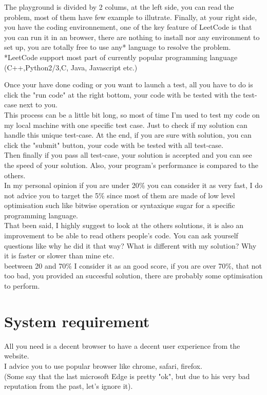 \documentclass[12pt, letterpaper]{article}
\begin{document}
The playground is divided by 2 colums, at the left side, you can read the problem, most of them have few example to illutrate. Finally, at your right side, you have the coding environnement, one of the key feature of LeetCode is that you can run it in an browser, there are nothing to install nor any environment to set up, you are totally free to use any* language to resolve the problem.\\
*LeetCode support most part of currently popular programming language (C++,Python2/3,C, Java, Javascript etc.)

Once your have done coding or you want to launch a test, all you have to do is click the "run code" at the right bottom, your code with be tested with the test-case next to you.\\

This process can be a little bit long, so most of time I'm used to test my code on my local machine with one specific test case. Just to check if my solution can handle this unique test-case.
At the end, if you are sure with solution, you can click the "submit" button, your code with be tested with all test-case.\\
Then finally if you pass all test-case, your solution is accepted and you can see the speed of your solution. Also, your program's performance is compared to the others.\\
In my personal opinion if you are under 20\% you can consider it as very fast, I do not advice you to target the 5\% since most of them are made of low level optimisation such like bitwise operation or syntaxique sugar for a specific programming language.\\
That been said, I highly suggest to look at the others solutions, it is also an improvement to be able to read others people's code. You can ask yourself questions like why he did it that way? What is different with my solution? Why it is faster or slower than mine etc.\\
beetween 20 and 70\% I consider it as an good score, if you are over 70\%, that not too bad, you provided an succesful solution, there are probably some optimisation to perform.\\


\section{System requirement}
All you need is a decent browser to have a decent user experience from the website.\\
I advice you to use popular browser like chrome, safari, firefox.\\
(Some say that the last microsoft Edge is pretty "ok", but due to his very bad reputation from the past, let's ignore it).
\end{document}
